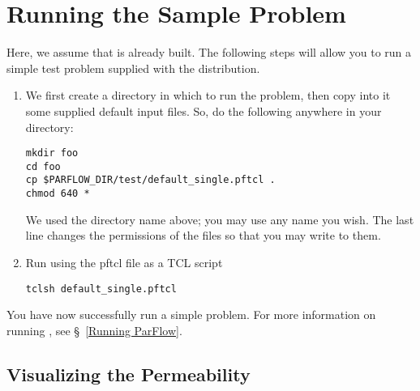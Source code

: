 
\section{Running the Sample Problem}
\label{Running the Sample Problem}

Here, we assume that \parflow{} is already built.
The following steps will allow you to run a simple test
problem supplied with the distribution.
\begin{enumerate}

\item
We first create a directory in which to run the problem,
then copy into it some supplied default input files.
So, do the following anywhere in your  directory:
\begin{display}\begin{verbatim}
mkdir foo
cd foo
cp $PARFLOW_DIR/test/default_single.pftcl .
chmod 640 *
\end{verbatim}\end{display}
We used the directory name  above;
you may use any name you wish.
The last line changes the permissions of the files so that
you may write to them.

\item
Run \parflow{} using the pftcl file as a TCL script
\begin{display}\begin{verbatim}
tclsh default_single.pftcl
\end{verbatim}\end{display}

\end{enumerate}
You have now successfully run a simple \parflow{} problem.
For more information on running \parflow{},
see \S~\ref{Running ParFlow}.

\subsection*{Visualizing the Permeability}

